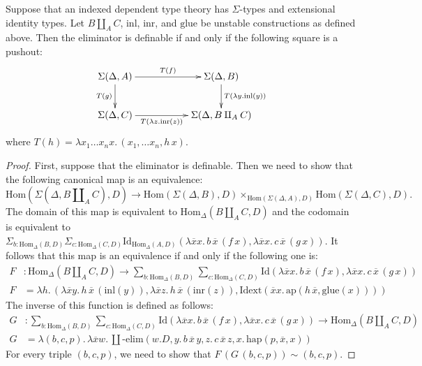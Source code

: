 \documentclass[reqno]{amsart}
\theoremstyle{definition}
\theoremstyle{remark}
\newcommand{\fs}[1]{\mathrm{#1}}
\newcommand{\Hom}{\fs{Hom}}
\newcommand{\Id}{\fs{Id}}
\newcommand{\pmap}{\fs{ap}}
\numberwithin{figure}{section}
\begin{document}
\begin{lem}
Suppose that an indexed dependent type theory has $\Sigma$-types and extensional identity types.
Let $B \amalg_A C$, $\fs{inl}$, $\fs{inr}$, and $\fs{glue}$ be unstable constructions as defined above.
Then the eliminator is definable if and only if the following square is a pushout:
\[ \xymatrix{ \Sigma(\Delta,A) \ar[rr]^-{T(f)} \ar[d]_{T(g)}        & & \Sigma(\Delta,B) \ar[d]^{T(\lambda y.\fs{inl}(y))} \\
              \Sigma(\Delta,C) \ar[rr]_-{T(\lambda z.\fs{inr}(z))}  & & \Sigma(\Delta, B \amalg_A C)
            } \]
where $T(h) = \lambda x_1 \ldots x_n x.\,(x_1, \ldots x_n, h\,x)$.
\end{lem}
\begin{proof}
First, suppose that the eliminator is definable.
Then we need to show that the following canonical map is an equivalence:
\[ \Hom(\Sigma(\Delta, B \amalg_A C), D) \to \Hom(\Sigma(\Delta,B),D) \times_{\Hom(\Sigma(\Delta,A),D)} \Hom(\Sigma(\Delta,C),D). \]
The domain of this map is equivalent to $\Hom_\Delta(B \amalg_A C, D)$ and the codomain is equivalent to $\Sigma_{b : \Hom_\Delta(B,D)} \Sigma_{c : \Hom_\Delta(C,D)} \Id_{\Hom_\Delta(A,D)}(\lambda \overline{x} x.\,b\,\overline{x}\,(f\,x), \lambda \overline{x} x.\,c\,\overline{x}\,(g\,x))$.
It follows that this map is an equivalence if and only if the following one is:
\begin{align*}
F & : \Hom_\Delta(B \amalg_A C, D) \to \sum_{b : \Hom_\Delta(B,D)} \sum_{c : \Hom_\Delta(C,D)} \Id(\lambda \overline{x} x.\,b\,\overline{x}\,(f\,x), \lambda \overline{x} x.\,c\,\overline{x}\,(g\,x)) \\
F & = \lambda h.\,(\lambda \overline{x} y.\,h\,\overline{x}\,(\fs{inl}(y)), \lambda \overline{x} z.\,h\,\overline{x}\,(\fs{inr}(z)), \fs{Idext}(\overline{x} x.\,\pmap(h\,\overline{x},\fs{glue}(x))))
\end{align*}
The inverse of this function is defined as follows:
\begin{align*}
G & : \sum_{b : \Hom_\Delta(B,D)} \sum_{c : \Hom_\Delta(C,D)} \Id(\lambda \overline{x} x.\,b\,\overline{x}\,(f\,x), \lambda \overline{x} x.\,c\,\overline{x}\,(g\,x)) \to \Hom_\Delta(B \amalg_A C, D) \\
G & = \lambda (b,c,p).\,\lambda \overline{x} w.\,\amalg\text{-}\fs{elim}(w.D, y.\,b\,\overline{x}\,y, z.\,c\,\overline{x}\,z, x.\,\fs{hap}(p,\overline{x},x))
\end{align*}
For every triple $(b,c,p)$, we need to show that $F\,(G\,(b,c,p)) \sim (b,c,p)$.

\end{proof}
\end{document}
